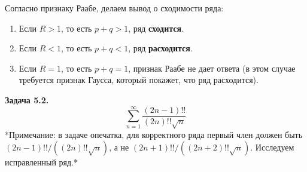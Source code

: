 \documentclass[a4paper, 12pt]{report}
\numberwithin{equation}{section}
\begin{document}
	Согласно признаку Раабе, делаем вывод о сходимости ряда:
	\begin{enumerate}
		\item Если $R > 1$, то есть $p+q > 1$, ряд \textbf{сходится}.
		\item Если $R < 1$, то есть $p+q < 1$, ряд \textbf{расходится}.
		\item Если $R = 1$, то есть $p+q = 1$, признак Раабе не дает ответа (в этом случае требуется признак Гаусса, который покажет, что ряд расходится).
	\end{enumerate}
	\textbf{Задача 5.2.}
	$$ \sum_{n=1}^{\infty} \frac{(2n-1)!!}{(2n)!! \sqrt{n}} $$
	*Примечание: в задаче опечатка, для корректного ряда первый член должен быть $(2n-1)!! / ((2n)!!\sqrt{n})$, а не $(2n+1)!! / ((2n+2)!!\sqrt{n})$. Исследуем исправленный ряд.*
	
\end{document}
